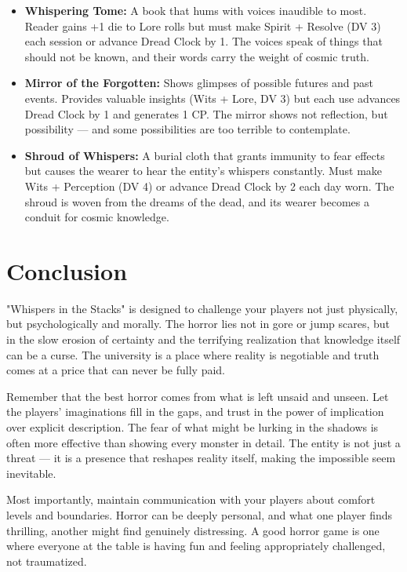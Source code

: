 \documentclass[11pt]{article}
\begin{document}
\begin{itemize}
\item \textbf{Whispering Tome:} A book that hums with voices inaudible to most. Reader gains +1 die to Lore rolls but must make Spirit + Resolve (DV 3) each session or advance Dread Clock by 1. The voices speak of things that should not be known, and their words carry the weight of cosmic truth.
\item \textbf{Mirror of the Forgotten:} Shows glimpses of possible futures and past events. Provides valuable insights (Wits + Lore, DV 3) but each use advances Dread Clock by 1 and generates 1 CP. The mirror shows not reflection, but possibility — and some possibilities are too terrible to contemplate.
\item \textbf{Shroud of Whispers:} A burial cloth that grants immunity to fear effects but causes the wearer to hear the entity's whispers constantly. Must make Wits + Perception (DV 4) or advance Dread Clock by 2 each day worn. The shroud is woven from the dreams of the dead, and its wearer becomes a conduit for cosmic knowledge.
\end{itemize}

\section{Conclusion}

"Whispers in the Stacks" is designed to challenge your players not just physically, but psychologically and morally. The horror lies not in gore or jump scares, but in the slow erosion of certainty and the terrifying realization that knowledge itself can be a curse. The university is a place where reality is negotiable and truth comes at a price that can never be fully paid.

Remember that the best horror comes from what is left unsaid and unseen. Let the players' imaginations fill in the gaps, and trust in the power of implication over explicit description. The fear of what might be lurking in the shadows is often more effective than showing every monster in detail. The entity is not just a threat — it is a presence that reshapes reality itself, making the impossible seem inevitable.

Most importantly, maintain communication with your players about comfort levels and boundaries. Horror can be deeply personal, and what one player finds thrilling, another might find genuinely distressing. A good horror game is one where everyone at the table is having fun and feeling appropriately challenged, not traumatized.
\end{document}
